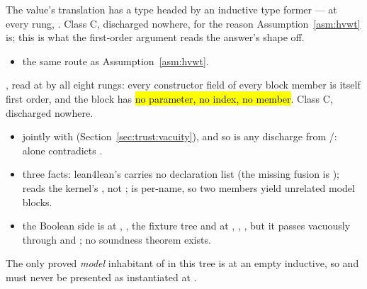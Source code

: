 \begin{assumption}
\label{asm:hty}
\stAssumed{}  The value's translation has a type headed by an inductive type
former --- at every rung, \hl{}. Class C, discharged nowhere, for the reason
Assumption~\ref{asm:hvwt} is; this is what the first-order argument reads the answer's shape off.
\begin{itemize}
\item {} the same  route as
Assumption~\ref{asm:hvwt}.
\end{itemize}
\end{assumption}

\begin{assumption}
\label{asm:hfo}
\stAssumed{}  , read at  by all eight rungs:
every constructor field of every block member is itself first order, and the block has \hl{no
parameter, no index, no  member}. Class C, discharged nowhere.
\begin{itemize}
\item {} jointly  with  (Section~\ref{sec:trust:vacuity}), and so
is any discharge from /:  alone contradicts .
\item {} three facts: lean4lean's  carries no
declaration list (the missing fusion is ); 
reads the kernel's , not ;  is
per-name, so two members yield unrelated model blocks.
\item {} the Boolean side  is  at ,
, the fixture tree and  at , , , but it
passes vacuously through  and ; no soundness theorem exists.
\end{itemize}
\end{assumption}

\begin{remark}
 The only proved \emph{model} inhabitant of  in this tree is at
an empty inductive, so  and 
must never be presented as instantiated at .
\end{remark}

